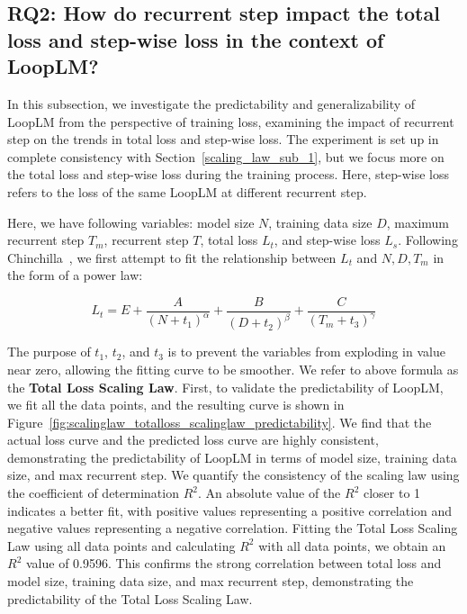 \documentclass[]{bytedance_seed}
\newcommand{\1}{\mathbf{1}}
\newcommand{\ut}{LoopLM}
\begin{document}
\subsection{RQ2: How do recurrent step impact the total loss and step-wise loss in the context of \ut{}?}
\label{scaling_law_sub_2}

In this subsection, we investigate the predictability and generalizability of \ut{} from the perspective of training loss, examining the impact of recurrent step on the trends in total loss and step-wise loss. The experiment is set up in complete consistency with Section~\ref{scaling_law_sub_1}, but we focus more on the total loss and step-wise loss during the training process. Here, step-wise loss refers to the loss of the same \ut{} at different recurrent step.

Here, we have following variables: model size $N$, training data size $D$, maximum recurrent step $T_m$, recurrent step $T$, total loss $L_t$, and step-wise loss $L_s$. Following Chinchilla~\citep{hoffmann2022training}, we first attempt to fit the relationship between $L_t$ and $N,D,T_m$ in the form of a power law:

$$
L_t = E + \frac{A}{(N+t_1)^\alpha} + \frac{B}{(D+t_2)^\beta} + \frac{C}{(T_m+t_3)^\gamma}
$$

The purpose of $t_1$, $t_2$, and $t_3$ is to prevent the variables from exploding in value near zero, allowing the fitting curve to be smoother. We refer to above formula as the \textbf{Total Loss Scaling Law}. First, to validate the predictability of \ut{}, we fit all the data points, and the resulting curve is shown in Figure~\ref{fig:scalinglaw_totalloss_scalinglaw_predictability}. We find that the actual loss curve and the predicted loss curve are highly consistent, demonstrating the predictability of \ut{} in terms of model size, training data size, and max recurrent step. We quantify the consistency of the scaling law using the coefficient of determination $R^2$. An absolute value of the $R^2$ closer to 1 indicates a better fit, with positive values representing a positive correlation and negative values representing a negative correlation. Fitting the Total Loss Scaling Law using all data points and calculating $R^2$ with all data points, we obtain an $R^2$ value of 0.9596. This confirms the strong correlation between total loss and model size, training data size, and max recurrent step, demonstrating the predictability of the Total Loss Scaling Law.
\end{document}
